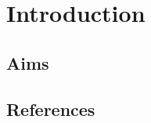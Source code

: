 \chapter{Introduction}

\section{Aims}

\section{References}

\cite{AbramskyJung1994,GierzEtAl2003,Streicher2006,Hart2020,Escardo2007}


